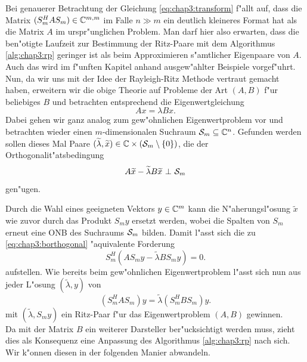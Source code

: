 Bei
genauerer Betrachtung der Gleichung \eqref{eq:chap3:transform} f"allt auf, dass die
Matrix $(S_m^H A S_m) \in \C^{m,m}$ im Falle $n \gg m$ ein deutlich kleineres
Format hat als die Matrix $A$ im urspr"unglichen Problem. Man darf hier also erwarten,
dass die ben"otigte Laufzeit zur Bestimmung der Ritz-Paare mit dem Algorithmus \ref{alg:chap3:rp}
geringer ist als beim Approximieren s"amtlicher Eigenpaare von $A$. Auch das
wird im f"unften Kapitel anhand ausgew"ahlter Beispiele vorgef"uhrt.\\

Nun, da wir uns mit der Idee der Rayleigh-Ritz Methode vertraut gemacht haben, erweitern wir die obige Theorie auf Probleme der Art $(A,B)$ f"ur beliebiges $B$ und betrachten entsprechend die Eigenwertgleichung
\begin{equation}\label{eq:chap3:gevp}
Ax = \lambda Bx.
\end{equation}
Dabei gehen wir ganz analog zum gew"ohnlichen Eigenwertproblem vor und betrachten wieder
einen $m$-dimensionalen Suchraum $\S_m\subseteq \Cn$.
Gefunden werden sollen dieses Mal Paare $ (\widetilde{\lambda}, \widetilde{x}) \in \C
\times (\S_m \setminus\{ 0\})$, die der Orthogonalit"atsbedingung
\begin{equation}\label{eq:chap3:borthogonal}
A\widetilde{x} - \widetilde{\lambda}B\widetilde{x} \ \bot \ \S_m
\end{equation}
gen"ugen.

\newpage

Durch die Wahl eines geeigneten Vektors $y\in\C^m$ kann die N"aherungsl"osung $\widetilde{x}$ wie zuvor durch das Produkt $S_m y$ ersetzt werden, wobei die Spalten von $S_m$ erneut eine ONB des Suchraums $\S_m$ bilden.
Damit l"asst sich die zu \eqref{eq:chap3:borthogonal} "aquivalente Forderung
\[
S_m^H(AS_m y - \widetilde{\lambda} BS_m y) = 0.
\]
aufstellen. Wie bereits beim gew"ohnlichen Eigenwertproblem l"asst sich nun aus jeder L"osung
$(\widetilde{\lambda}, y)$ von
\begin{equation}\label{eq:chap3:transformedevp}
(S_m^H AS_m) y = \widetilde{\lambda} (S_m^H B S_m) y.
\end{equation}
mit $(\widetilde{\lambda}, S_m y)$ ein Ritz-Paar f"ur das Eigenwertproblem $(A,B)$ gewinnen.\\

Da mit der Matrix $B$ ein weiterer Darsteller ber"ucksichtigt werden muss, zieht dies als Konsequenz eine Anpassung des Algorithmus \ref{alg:chap3:rp} nach sich. Wir k"onnen diesen in der folgenden Manier abwandeln.

